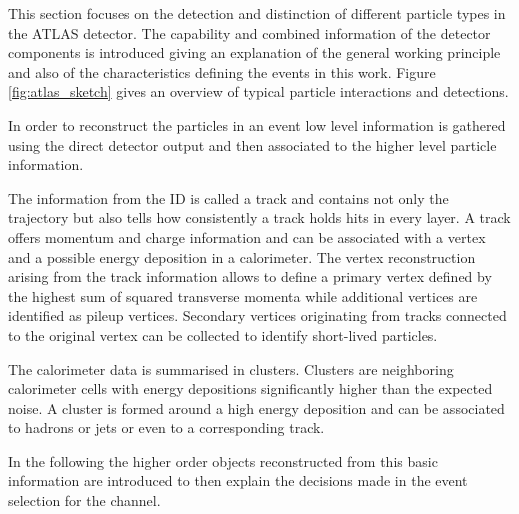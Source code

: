 This section focuses on the detection and distinction of different particle types in the ATLAS detector. The capability and combined information of the detector components is introduced giving an explanation of the general working principle and also of the characteristics defining the events in this work. Figure \ref{fig:atlas_sketch} gives an overview of typical particle interactions and detections.

In order to reconstruct the particles in an event low level information is gathered using the direct detector output and then associated to the higher level particle information.

The information from the ID is called a track and contains not only the trajectory but also tells how consistently a track holds hits in every layer. A track offers momentum and charge information and can be associated with a vertex and a possible energy deposition in a calorimeter. 
The vertex reconstruction arising from the track information allows to define a primary vertex defined by the highest sum of squared transverse momenta while additional vertices are identified as pileup vertices.
Secondary vertices originating from tracks connected to the original vertex can be collected to identify short-lived particles.

The calorimeter data is summarised in clusters. Clusters are neighboring calorimeter cells with energy depositions significantly higher than the expected noise. A cluster is formed around a high energy deposition and can be associated to hadrons or jets or even to a corresponding track.

In the following the higher order objects reconstructed from this basic information are introduced to then explain the decisions made in the event selection for the \tW channel.


